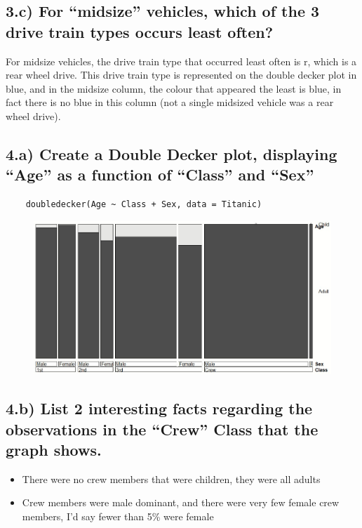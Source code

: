 \documentclass[11pt]{article}
\begin{document}
\subsection*{3.c)  For “midsize” vehicles, which of the 3 drive train types occurs least often?}
For midsize vehicles, the drive train type that occurred least often is r, which is a rear wheel drive. This drive train type is represented on the double decker plot in blue, and in the midsize column, the colour that appeared the least is blue, in fact there is no blue in this column (not a single midsized vehicle was a rear wheel drive).

\subsection*{4.a) Create a Double Decker plot, displaying “Age” as a function of “Class” and “Sex”}
\begin{verbatim}
    doubledecker(Age ~ Class + Sex, data = Titanic)
\end{verbatim}

\begin{figure}[H]
\includegraphics[width = 15cm]{4a.jpg}
\centering
\end{figure}

\newpage

\subsection*{4.b) List 2 interesting facts regarding the observations in the “Crew” Class that the graph shows.}

\begin{itemize}
    \item There were no crew members that were children, they were all adults  
    \item Crew members were male dominant, and there were very few female crew members, I'd say fewer than 5\% were female
\end{itemize}
\end{document}
